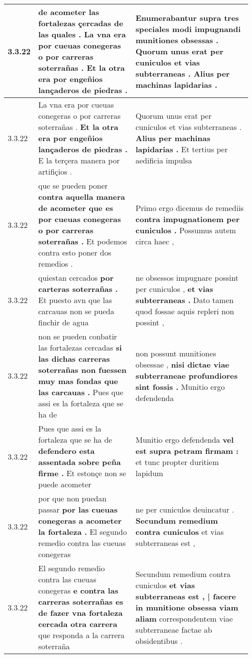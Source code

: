 \begin{tabular}{|p{1cm}|p{6.5cm}|p{6.5cm}|}
3.3.22 & de acometer las fortalezas çercadas de las quales . \textbf{ La vna era por cueuas conegeras o por carreras soterrañas . } Et la otra era por engeñios lançaderos de piedras . & Enumerabantur supra tres speciales modi impugnandi munitiones obsessas . \textbf{ Quorum unus erat per cuniculos et vias subterraneas . } Alius per machinas lapidarias . \\\hline
3.3.22 & La vna era por cueuas conegeras o por carreras soterrañas . \textbf{ Et la otra era por engeñios lançaderos de piedras . } E la terçera manera por artifiçios . & Quorum unus erat per cuniculos et vias subterraneas . \textbf{ Alius per machinas lapidarias . } Et tertius per aedificia impulsa \\\hline
3.3.22 & que se pueden poner \textbf{ contra aquella manera de acometer que es por cueuas conegeras o por carreras soterrañas . } Et podemos contra esto poner dos remedios . & Primo ergo dicemus de remediis \textbf{ contra impugnationem per cuniculos . } Possumus autem circa haec , \\\hline
3.3.22 & quiestan cercados \textbf{ por carteras soterrañas . } Et puesto avn que las carcauas non se pueda finchir de agua & ne obsessos impugnare possint per cuniculos , \textbf{ et vias subterraneas . } Dato tamen quod fossae aquis repleri non possint , \\\hline
3.3.22 & non se pueden conbatir las fortalezas cercadas \textbf{ si las dichas carreras soterrañas non fuessen muy mas fondas que las carcauas . } Pues que assi es la fortaleza que se ha de & non possunt munitiones obsessae , \textbf{ nisi dictae viae subterraneae profundiores sint fossis . } Munitio ergo defendenda \\\hline
3.3.22 & Pues que assi es la fortaleza que se ha de \textbf{ defendero esta assentada sobre peña firme . } Et estonçe non se puede acometer & Munitio ergo defendenda \textbf{ vel est supra petram firmam : } et tunc propter duritiem lapidum \\\hline
3.3.22 & por que non puedan passar \textbf{ por las cueuas conegeras a acometer la fortaleza . } El segundo remedio contra las cueuas conegeras & ne per cuniculos deuincatur . \textbf{ Secundum remedium contra cuniculos } et vias subterraneas est , \\\hline
3.3.22 & El segundo remedio contra las cueuas conegeras \textbf{ e contra las carreras soterrañas es de fazer vna fortaleza cercada otra carrera } que responda a la carrera soterraña & Secundum remedium contra cuniculos \textbf{ et vias subterraneas est , | facere in munitione obsessa viam aliam } correspondentem viae subterraneae factae ab obsidentibus . \\\hline

\end{tabular}
